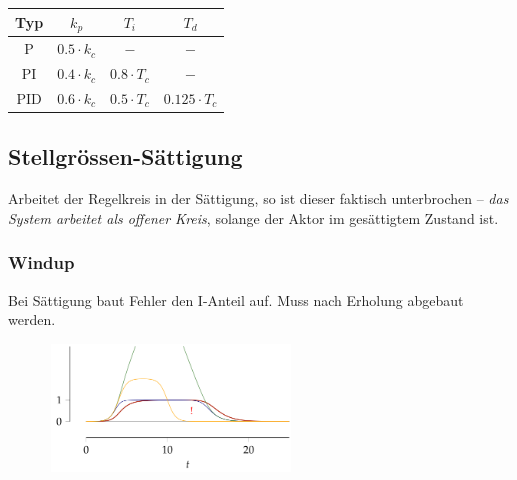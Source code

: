 \documentclass[
  10pt,
  a4paper,
  twocolumn]{article}
\numberwithin{equation}{section}
\begin{document}
\begin{center}
\begin{tabular}{|c|c|c|c|}
\hline
Typ & $k_p$ & $T_i$ & $T_d$ \\
\hline
P   & $0.5\cdot k_c$     & $-$           & $-$ \\
PI  & $0.4\cdot k_c$     & $0.8\cdot T_c$ & $-$ \\
PID & $0.6\cdot k_c$     & $0.5\cdot T_c$ & $0.125\cdot T_c$ \\
\hline
\end{tabular}
\end{center}

\hypertarget{stellgruxf6ssen-suxe4ttigung}{%
\subsection{Stellgrössen-Sättigung}\label{stellgruxf6ssen-suxe4ttigung}}

\begin{tcolorbox}[enhanced jigsaw, colframe=quarto-callout-warning-color-frame, toptitle=1mm, title=\textcolor{quarto-callout-warning-color}{\faExclamationTriangle}\hspace{0.5em}{Sättigungseffekt}, bottomtitle=1mm, opacityback=0, left=2mm, opacitybacktitle=0.6, bottomrule=.15mm, leftrule=.75mm, coltitle=black, titlerule=0mm, colback=white, breakable, toprule=.15mm, colbacktitle=quarto-callout-warning-color!10!white, rightrule=.15mm, arc=.35mm]

Arbeitet der Regelkreis in der Sättigung, so ist dieser faktisch
unterbrochen -- \emph{das System arbeitet als offener Kreis}, solange
der Aktor im gesättigtem Zustand ist.

\end{tcolorbox}

\hypertarget{windup}{%
\subsubsection{Windup}\label{windup}}

Bei Sättigung baut Fehler den I-Anteil auf. Muss nach Erholung abgebaut
werden.

\begin{figure}[H]

{\centering \includegraphics[width=6.5cm,height=3.4cm]{images/paste-27.png}

}

\end{figure}
\end{document}
